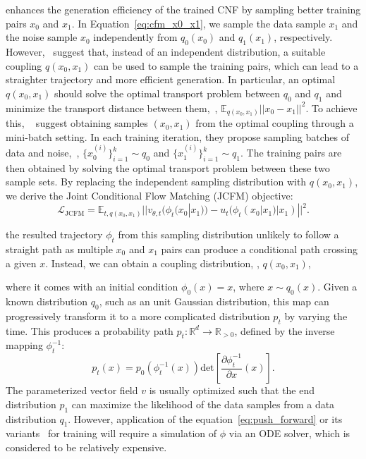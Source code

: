 enhances the generation efficiency of the trained CNF by sampling better training pairs $x_0$ and $x_1$.
%
In Equation~\ref{eq:cfm_x0_x1}, we sample the data sample $x_1$ and the noise sample $x_0$ independently from $q_0(x_0)$ and $q_1(x_1)$, respectively.
%
However,~\cite{pooladian2023multisample,tong2023improving} suggest that, instead of an independent distribution, a suitable coupling $q(x_0, x_1)$ can be used to sample the training pairs, which can lead to a straighter trajectory and more efficient generation. 
%
In particular, an optimal $q(x_0, x_1)$ should solve the optimal transport problem between $q_0$ and $q_1$ and minimize the transport distance between them,~\ie, $\mathbb{E}_{q(x_0, x_1)}||x_0 - x_1||^2$.
%
To achieve this, ~\cite{pooladian2023multisample,tong2023improving} suggest obtaining samples $(x_0, x_1)$ from the optimal coupling through a mini-batch setting. 
%
In each training iteration, they propose sampling batches of data and noise,~\ie, $\{x_0^{(i)}\}^k_{i=1} \sim q_0$ and $\{x_1^{(i)}\}^k_{i=1} \sim q_1$. 
%
The training pairs are then obtained by solving the optimal transport problem between these two sample sets.
%
By replacing the independent sampling distribution with $q(x_0, x_1)$, we derive the Joint Conditional Flow Matching (JCFM) objective:
\begin{equation}
\label{eq:jcfm_x0_x1}
\mathcal{L}_{\text{JCFM}} = \mathbb{E}_{t,q(x_0, x_1)}||v_{\theta,t}(\phi_t(x_0|x_1)) - u_t(\phi_t(x_0|x_1)|x_1)||^2.
\end{equation}






the resulted trajectory $\phi_t$ from this sampling distribution unlikely to follow a straight path as multiple $x_0$ and $x_1$ pairs can produce a conditional path crossing a given $x$.
%
Instead, we can obtain a coupling distribution, \ie, $q(x_0, x_1)$,

where it comes with an initial condition $\phi_0(x) = x$, where $x \sim q_0(x)$.
Given a known distribution $q_0$, such as an unit Gaussian distribution, this map can progressively transform it to a more complicated distribution $p_t$ by varying the time.
%
This produces a probability path $p_t : \mathbb{R}^d \rightarrow \mathbb{R}_{> 0}$, defined by the inverse mapping $\phi_t^{-1}$:
\begin{equation}
\label{eq:push_forward}
    p_t(x) = p_0(\phi_t^{-1}(x)) \text{det}[\frac{\partial \phi_t^{-1}}{\partial x}(x)].
\end{equation}
%
The parameterized vector field $v$ is usually optimized such that the end distribution $p_1$ can maximize the likelihood of the data samples from a data distribution $q_1$.
%
However, application of the equation~\ref{eq:push_forward} or its variants~\cite{chen2018neural} for training will require a simulation of $\phi$ via an ODE solver, which is considered to be relatively expensive.

